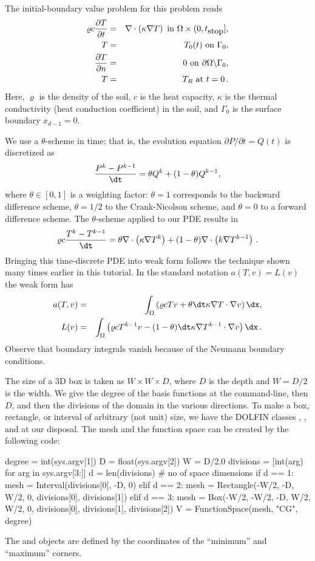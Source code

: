 The initial-boundary value problem for this problem reads
\begin{eqnarray}
\varrho c \frac{\partial T}{\partial t} &=& \nabla\cdot\left( \kappa\nabla T\right)\hbox{ in }\Omega\times (0,t_{\hbox{stop}}],\\
T &=& T_0(t)\hbox{ on }\Gamma_0,\\
\frac{\partial T}{\partial n} &=& 0\hbox{ on }\partial\Omega\backslash\Gamma_0,\\
T &=& T_R\hbox{ at }t =0\thinspace .
\end{eqnarray}
Here, $\varrho$ is the density of the soil, $c$ is the
heat capacity, $\kappa$ is the thermal conductivity
(heat conduction coefficient)
in the soil, and $\Gamma_0$ is the surface boundary $x_{d-1}=0$.

We use a $\theta$-scheme in time; that is, the evolution equation
$\partial P/\partial t=Q(t)$ is discretized as
\[ \frac{P^k - P^{k-1}}{\dt} = \theta Q^k + (1-\theta )Q^{k-1},\]
where $\theta\in[0,1]$ is a weighting factor: $\theta =1$ corresponds
to the backward difference scheme, $\theta =1/2$ to the Crank-Nicolson
scheme, and $\theta =0$ to a forward difference scheme.
The $\theta$-scheme applied to our PDE results in
\[
\varrho c \frac{T^k-T^{k-1}}{\dt} =
\theta \nabla\cdot\left( \kappa\nabla T^k\right)
+ (1-\theta) \nabla\cdot\left( k\nabla T^{k-1}\right)\langtangenep
\]
Bringing this time-discrete PDE into weak form follows the technique shown
many times earlier in this tutorial. In the standard notation
$a(T,v)=L(v)$ the weak form has
\begin{eqnarray}
a(T,v) &=& \int_\Omega
\left( \varrho c Tv + \theta{\dt} \kappa\nabla T\cdot \nabla v\right)\dx,\\
L(v) &=& \int_\Omega \left( \varrho c T^{k-1}v - (1-\theta){\dt}
\kappa\nabla T^{k-1}\cdot \nabla v\right)\dx\langtangenep
\end{eqnarray}
Observe that boundary integrals vanish because of the Neumann boundary
conditions.

The size of a 3D box is taken as $W\times W\times D$, where $D$ is
the depth and $W=D/2$ is the width.
We give the degree of the basis functions at the command-line, then $D$,
and then the divisions of the domain in the various directions.
To make a box, rectangle, or interval of arbitrary (not unit) size,
we have the DOLFIN classes , , and
 at our disposal. The mesh and the function space
can be created by the following code:
\begin{python}
degree = int(sys.argv[1])
D = float(sys.argv[2])
W = D/2.0
divisions = [int(arg) for arg in sys.argv[3:]]
d = len(divisions)  # no of space dimensions
if d == 1:
    mesh = Interval(divisions[0], -D, 0)
elif d == 2:
    mesh = Rectangle(-W/2, -D, W/2, 0, divisions[0], divisions[1])
elif d == 3:
    mesh = Box(-W/2, -W/2, -D, W/2, W/2, 0,
               divisions[0], divisions[1], divisions[2])
V = FunctionSpace(mesh, "CG", degree)
\end{python}
The  and  objects are defined by the coordinates
of the ``minimum'' and ``maximum'' corners.

